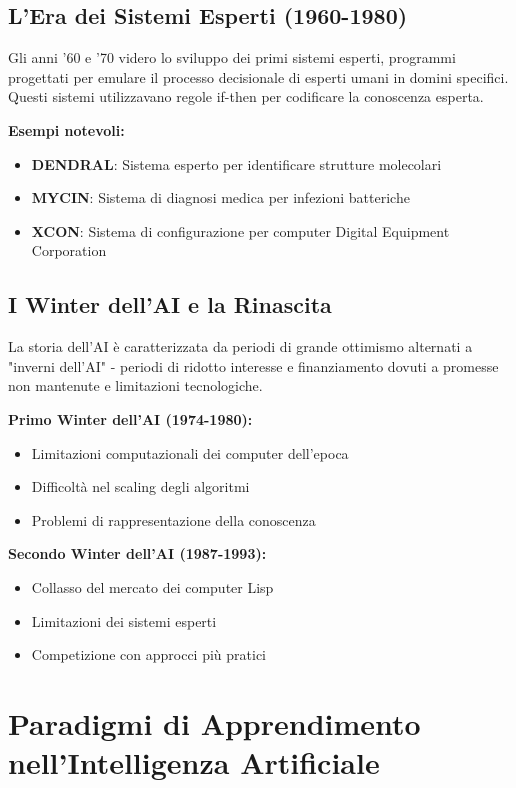 \documentclass[12pt,a4paper,twoside]{report}
\begin{document}
\subsection{L'Era dei Sistemi Esperti (1960-1980)}

Gli anni '60 e '70 videro lo sviluppo dei primi sistemi esperti, programmi progettati per emulare il processo decisionale di esperti umani in domini specifici. Questi sistemi utilizzavano regole if-then per codificare la conoscenza esperta.

\textbf{Esempi notevoli:}
\begin{itemize}
    \item \textbf{DENDRAL}: Sistema esperto per identificare strutture molecolari
    \item \textbf{MYCIN}: Sistema di diagnosi medica per infezioni batteriche
    \item \textbf{XCON}: Sistema di configurazione per computer Digital Equipment Corporation
\end{itemize}

\subsection{I Winter dell'AI e la Rinascita}

La storia dell'AI è caratterizzata da periodi di grande ottimismo alternati a "inverni dell'AI" - periodi di ridotto interesse e finanziamento dovuti a promesse non mantenute e limitazioni tecnologiche.

\textbf{Primo Winter dell'AI (1974-1980):}
\begin{itemize}
    \item Limitazioni computazionali dei computer dell'epoca
    \item Difficoltà nel scaling degli algoritmi
    \item Problemi di rappresentazione della conoscenza
\end{itemize}

\textbf{Secondo Winter dell'AI (1987-1993):}
\begin{itemize}
    \item Collasso del mercato dei computer Lisp
    \item Limitazioni dei sistemi esperti
    \item Competizione con approcci più pratici
\end{itemize}

\section{Paradigmi di Apprendimento nell'Intelligenza Artificiale}
\end{document}
